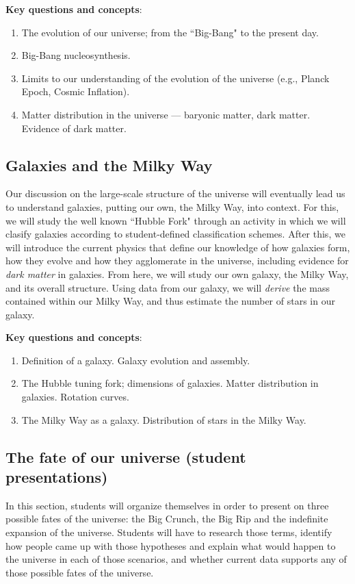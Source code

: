 \documentclass{tufte-handout}
\begin{document}
\begin{fullwidth}
\vspace{0.5 cm}
\noindent \textbf{Key questions and concepts}:
\begin{enumerate}
\item The evolution of our universe; from the ``Big-Bang" to the present day.
\item Big-Bang nucleosynthesis.
\item Limits to our understanding of the evolution of the universe (e.g., Planck Epoch, Cosmic Inflation).
\item Matter distribution in the universe --- baryonic matter, dark matter. Evidence of dark matter.
\end{enumerate}

\subsection{Galaxies and the Milky Way}
Our discussion on the large-scale structure of the universe will eventually lead us to understand galaxies, putting our own, the Milky Way, 
into context. For this, we will study the well known ``Hubble Fork" through an activity in which we will clasify galaxies according to student-defined 
classification schemes. After this, we will introduce the current physics that define our knowledge of how galaxies form, how they evolve and 
how they agglomerate in the universe, including evidence for \textit{dark matter} in galaxies. From here, we will study our own galaxy, the Milky Way, 
and its overall structure. Using data from our galaxy, we will \textit{derive} the mass contained within our Milky Way, and thus estimate the number 
of stars in our galaxy. 

\vspace{0.5 cm}
\noindent \textbf{Key questions and concepts}:
\begin{enumerate}
\item Definition of a galaxy. Galaxy evolution and assembly. 
\item The Hubble tuning fork; dimensions of galaxies. Matter distribution in galaxies. Rotation curves.
\item The Milky Way as a galaxy. Distribution of stars in the Milky Way. 
\end{enumerate}

\subsection{The fate of our universe (student presentations)}
In this section, students will organize themselves in order to present on three possible fates of the universe: the Big Crunch, the Big Rip and 
the indefinite expansion of the universe. Students will have to research those terms, identify how people came up with those hypotheses and 
explain what would happen to the universe in each of those scenarios, and whether current data supports any of those possible fates of the 
universe.


\end{fullwidth}
\end{document}

